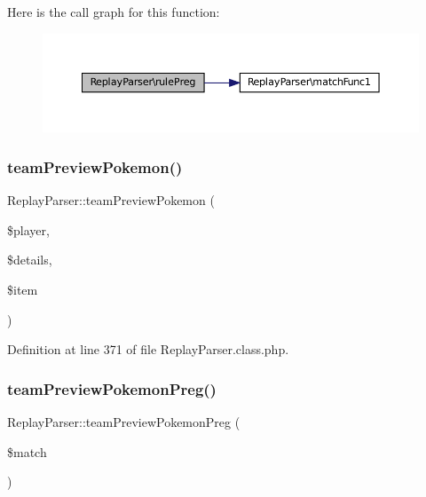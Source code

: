 Here is the call graph for this function\+:\nopagebreak
\begin{figure}[H]
\begin{center}
\leavevmode
\includegraphics[width=350pt]{class_replay_parser_ab8290a1fa1d0dce5b391fc53ad808775_cgraph}
\end{center}
\end{figure}
\mbox{\label{class_replay_parser_ae5cd9d5fab44c3ee94f637b2e96ea8ca}} 
\subsubsection{\texorpdfstring{team\+Preview\+Pokemon()}{teamPreviewPokemon()}}
{\footnotesize\ttfamily Replay\+Parser\+::team\+Preview\+Pokemon (\begin{DoxyParamCaption}\item[{}]{\$player,  }\item[{}]{\$details,  }\item[{}]{\$item }\end{DoxyParamCaption})}



Definition at line 371 of file Replay\+Parser.\+class.\+php.

\mbox{\label{class_replay_parser_a9450b4b031bb492a63c22d86a50dc9c2}} 
\subsubsection{\texorpdfstring{team\+Preview\+Pokemon\+Preg()}{teamPreviewPokemonPreg()}}
{\footnotesize\ttfamily Replay\+Parser\+::team\+Preview\+Pokemon\+Preg (\begin{DoxyParamCaption}\item[{}]{\$match }\end{DoxyParamCaption})}



